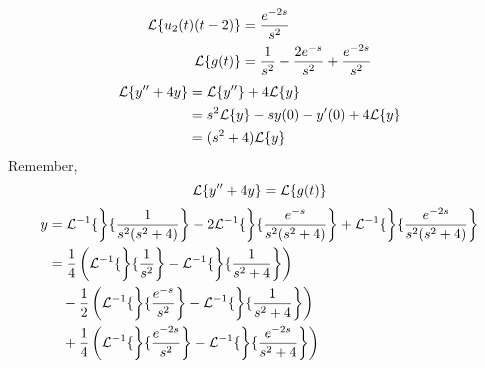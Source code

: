 \documentclass[diffeq.tex]{subfiles}
\begin{document}
\begin{example}
\begin{alignat}{1}
            \mathcal{L}\{u_{2}(t)(t - 2)\} &= \frac{e^{-2s}}{s^{2}}\\
            \mathcal{L}\{g(t)\} &= \frac{1}{s^{2}} - \frac{2e^{-s}}{s^{2}} + \frac{e^{-2s}}{s^{2}}\\
        \end{alignat}
        \begin{alignat}{1}
            \mathcal{L}\{y'' + 4y\} &= \mathcal{L}\{y''\} + 4\mathcal{L}\{y\}\\
            &= s^{2}\mathcal{L}\{y\}-sy(0)-y'(0)+4\mathcal{L}\{y\}\\
            &= (s^{2} + 4)\mathcal{L}\{y\}
        \end{alignat}
        Remember,
        \begin{equation}
            \mathcal{L}\{y'' + 4y\} = \mathcal{L}\{g(t)\}
        \end{equation}
        \begin{alignat}{1}
            y &= \mathcal{L}^{-1}\{\left\}\{\frac{1}{s^{2}(s^{2} + 4)}\right\} - 2\mathcal{L}^{-1}\{\left\}\{\frac{e^{-s}}{s^{2}(s^{2} + 4)}\right\} + \mathcal{L}^{-1}\{\left\}\{\frac{e^{-2s}}{s^{2}(s^{2} + 4)}\right\}\\
            &= \frac{1}{4}\left(\mathcal{L}^{-1}\{\left\}\{\frac{1}{s^{2}}\right\} - \mathcal{L}^{-1}\{\left\}\{\frac{1}{s^{2} + 4}\right\}\right)\\
            &\quad - \frac{1}{2}\left(\mathcal{L}^{-1}\{\left\}\{\frac{e^{-s}}{s^{2}}\right\} - \mathcal{L}^{-1}\{\left\}\{\frac{1}{s^{2} + 4}\right\}\right)\\
            &\quad + \frac{1}{4}\left(\mathcal{L}^{-1}\{\left\}\{\frac{e^{-2s}}{s^{2}}\right\} - \mathcal{L}^{-1}\{\left\}\{\frac{e^{-2s}}{s^{2} + 4}\right\}\right)\nonumber
        \end{alignat}
    \end{example}
\end{document}
